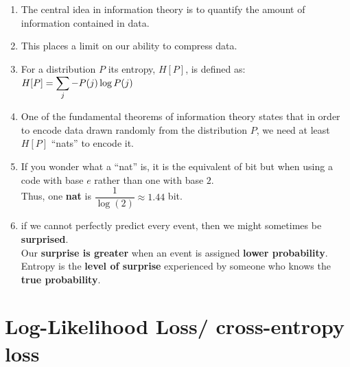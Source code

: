 \begin{enumerate}[itemsep=0.2cm]
    \item The central idea in information theory is to quantify the amount of information contained in data. 
    
    \item This places a limit on our ability to compress data.

    \item For a distribution $P$ its entropy, $H[P]$, is defined as:
    $
        \hfill
        H[P] 
        = \dsum_j - P(j) \log P(j)
        \hfill
    $

    \item One of the fundamental theorems of information theory states that in order to encode data drawn randomly from the distribution $P$, we need at least $H[P]$ “nats” to encode it.

    \item If you wonder what a “nat” is, it is the equivalent of bit but when using a code with base $e$ rather than one with base $2$. \\
    Thus, one \textbf{nat} is $\dfrac{1}{\log(2)} \approx 1.44$ bit.

    \item if we cannot perfectly predict every event, then we might sometimes be \textbf{surprised}.\\
    Our \textbf{surprise is greater} when an event is assigned \textbf{lower probability}.\\
    Entropy is the \textbf{level of surprise} experienced by someone who knows the \textbf{true probability}.

\end{enumerate}





\section{Log-Likelihood Loss/ cross-entropy loss \cite{dnn-1}} \label{Log-Likelihood Loss/ cross-entropy loss}


